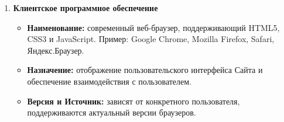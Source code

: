 \begin{enumerate}
\begin{itemize}
        \item \textbf{Назначение:} обеспечение среды выполнения для работы необходимого программного обспечения.
        \item \textbf{Версия:} актуальная стабильная версия на момент разработки.
        \item \textbf{Источник:} открытое программное обеспечение.
    \end{itemize}
    \item \textbf{Клиентское программное обеспечение}
    \begin{itemize}
        \item \textbf{Наименование:} современный веб-браузер, поддерживающий HTML5, CSS3 и JavaScript. Пример: Google Chrome, Mozilla Firefox, Safari, Яндекс.Браузер.
        \item \textbf{Назначение:} отображение пользовательского интерфейса Сайта и обеспечение взаимодействия с пользователем.
        \item \textbf{Версия и Источник:} зависят от конкретного пользователя, поддерживаются актуальный версии браузеров.
    \end{itemize}
\end{enumerate}